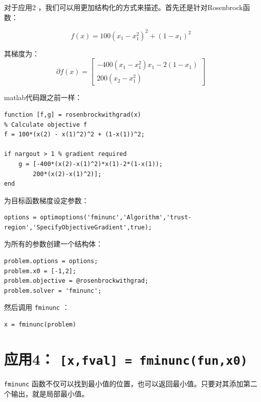 \documentclass[10pt,a4paper,UTF8]{article}
\begin{document}
对于应用2 ，我们可以用更加结构化的方式来描述。首先还是针对Rosenbrock函数：

\begin{equation}
\label{eq:30}
f(x) = 100(x_{1} - x_{1}^{2})^{2} + (1-x_{1})^{2}
\end{equation}

其梯度为：
\begin{equation}
\label{eq:4}
\partial f(x) =
\begin{bmatrix}
-400(x_{1} - x_{1}^{2})x_{1} - 2(1-x_{1}) \\
200(x_{2} - x_{1}^{2})
\end{bmatrix}
\end{equation}

matlab代码跟之前一样：
\lstset{language=matlab,label= ,caption= ,captionpos=b,numbers=none}
\begin{lstlisting}
function [f,g] = rosenbrockwithgrad(x)
% Calculate objective f
f = 100*(x(2) - x(1)^2)^2 + (1-x(1))^2;

if nargout > 1 % gradient required
    g = [-400*(x(2)-x(1)^2)*x(1)-2*(1-x(1));
        200*(x(2)-x(1)^2)];
end
\end{lstlisting}

为目标函数梯度设定参数：
\lstset{language=matlab,label= ,caption= ,captionpos=b,numbers=none}
\begin{lstlisting}
options = optimoptions('fminunc','Algorithm','trust-region','SpecifyObjectiveGradient',true);
\end{lstlisting}

为所有的参数创建一个结构体：
\lstset{language=matlab,label= ,caption= ,captionpos=b,numbers=none}
\begin{lstlisting}
problem.options = options;
problem.x0 = [-1,2];
problem.objective = @rosenbrockwithgrad;
problem.solver = 'fminunc';
\end{lstlisting}

然后调用 \texttt{fminunc} ：
\lstset{language=matlab,label= ,caption= ,captionpos=b,numbers=none}
\begin{lstlisting}
x = fminunc(problem)
\end{lstlisting}
\section{应用4： \texttt{[x,fval] = fminunc(fun,x0)}}
\label{sec:org6aad9b0}


\texttt{fminunc} 函数不仅可以找到最小值的位置，也可以返回最小值。只要对其添加第二个输出，就是局部最小值。
\end{document}
